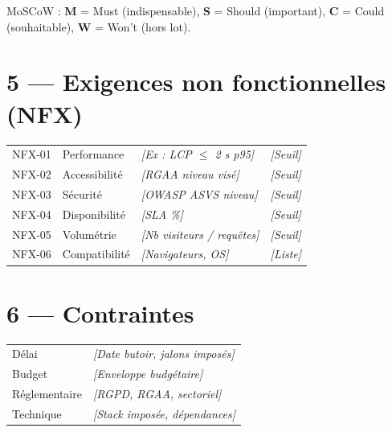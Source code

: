 \documentclass[11pt,a4paper,oneside]{report}
\begin{document}
\vspace{4pt}
{\footnotesize MoSCoW : \textbf{M} = Must (indispensable), \textbf{S} = Should (important), \textbf{C} = Could (souhaitable), \textbf{W} = Won't (hors lot).}

\section*{5 --- Exigences non fonctionnelles (NFX)}

\renewcommand{\arraystretch}{1.3}
\begin{tabularx}{\textwidth}{C{1.2cm} L{3.2cm} Y C{2.5cm}}
\toprule
{} &  &  &  \\
\midrule
NFX-01 & Performance       & \textit{[Ex : LCP $\leq$ 2 s p95]}            & \textit{[Seuil]} \\
NFX-02 & Accessibilité     & \textit{[RGAA niveau visé]}                    & \textit{[Seuil]} \\
NFX-03 & Sécurité          & \textit{[OWASP ASVS niveau]}                   & \textit{[Seuil]} \\
NFX-04 & Disponibilité     & \textit{[SLA \%]}                              & \textit{[Seuil]} \\
NFX-05 & Volumétrie        & \textit{[Nb visiteurs / requêtes]}             & \textit{[Seuil]} \\
NFX-06 & Compatibilité     & \textit{[Navigateurs, OS]}                     & \textit{[Liste]} \\
\bottomrule
\end{tabularx}

\section*{6 --- Contraintes}

\renewcommand{\arraystretch}{1.3}
\begin{tabularx}{\textwidth}{L{3cm} Y}
\toprule
{} &  \\
\midrule
Délai          & \textit{[Date butoir, jalons imposés]} \\
Budget         & \textit{[Enveloppe budgétaire]} \\
Réglementaire  & \textit{[RGPD, RGAA, sectoriel]} \\
Technique      & \textit{[Stack imposée, dépendances]} \\
\bottomrule
\end{tabularx}
\end{document}
